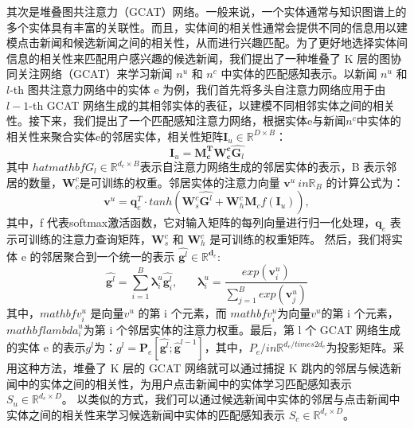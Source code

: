 \documentclass[withoutpreface,bwprint]{cumcmthesis} %
\begin{document}
	其次是堆叠图共注意力（GCAT）网络。一般来说，一个实体通常与知识图谱上的多个实体具有丰富的关联性。而且，实体间的相关性通常会提供不同的信息用以建模点击新闻和候选新闻之间的相关性，从而进行兴趣匹配。为了更好地选择实体间信息的相关性来匹配用户感兴趣的候选新闻，我们提出了一种堆叠了 K 层的图协同关注网络（GCAT）来学习新闻 $ {n}^{u}$ 和 ${n} ^ {c} $ 中实体的匹配感知表示。以新闻 $ {n}^{u} $ 和 $l$-th 图共注意力网络中的实体 e 为例，我们首先将多头自注意力网络应用于由 $l-1$-th GCAT 网络生成的其相邻实体的表征，以建模不同相邻实体之间的相关性。接下来，我们提出了一个匹配感知注意力网络，根据实体e与新闻${n}^{c}$中实体的相关性来聚合实体e的邻居实体，相关性矩阵$ \mathbf{I}_u \in \mathbb{R}^{D \times B} $：
	\begin{equation}
	\mathbf{I}_u = \mathbf{M^T_c} \mathbf{W^c_c} \hat{\mathbf{G}_l}
	\end{equation}
	其中 $hat{mathbf{G}_l} \in \mathbb{R}^{d_e \times B}$表示自注意力网络生成的邻居实体的表示，B 表示邻居的数量，$\mathbf{W}^c_c$是可训练的权重。邻居实体的注意力向量 $\mathbf{v}^{u} \ in \mathbb{R}_B $ 的计算公式为：
	\begin{equation}
	\mathbf{v}^{u} = \mathbf{q}^T_e \cdot tanh(\mathbf{W}^c_s \hat{\mathbf{G}^{l}} + \mathbf{W}^c_h \mathbf{M}_c f(\mathbf{I}_u) ), 
	\end{equation}
	其中，f 代表softmax激活函数，它对输入矩阵的每列向量进行归一化处理，$\mathbf{q}_e$ 表示可训练的注意力查询矩阵，$\mathbf{W}^c_s$ 和 $\mathbf{W}^c_h$ 是可训练的权重矩阵。
	然后，我们将实体 e 的邻居聚合到一个统一的表示 $\hat{\mathbf{g}^{l}} \in \mathbb{R}^{\mathbf{d}_e}  $:
	\begin{equation}
	\hat{\mathbf{g}^{l}} = \sum_{i=1}^{B}\mathbf{\lambda}^u_i\hat{\mathbf{g}^l_i},{~~~~~~~~}      
	\mathbf{\lambda}^u_i = \frac{exp(\mathbf{v}^u_i)}{\sum_{j=1}^{B}exp(\mathbf{v}^u_j)}
	\end{equation}
	其中，$mathbf{v}^u_i$ 是向量$v^u$ 的第 i 个元素，而
	$mathbf{v}^u_i$为向量$v^u$的第 i 个元素，$mathbf{lambda}^u_i$为第 i 个邻居实体的注意力权重。最后，第 l 个 GCAT 网络生成的实体 e 的表示$g^l$为：$g^l = \mathbf{P}_e[\hat{\mathbf{g}^{l}};\hat{\mathbf{g}}^{l-1}]$，其中，$P_e/in \mathbb{R}^{d_e/times2d_e}$为投影矩阵。采用这种方法，堆叠了 K 层的 GCAT 网络就可以通过捕捉 K 跳内的邻居与候选新闻中的实体之间的相关性，为用户点击新闻中的实体学习匹配感知表示 $S_u \in \mathbb{R}^{d_e \times D}$。 以类似的方式，我们可以通过候选新闻中实体的邻居与点击新闻中实体之间的相关性来学习候选新闻中实体的匹配感知表示 $S_c \in \mathbb{R}^{d_e \times D}$。
	
\end{document}
